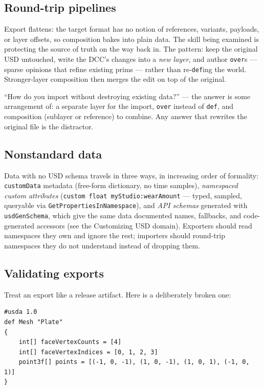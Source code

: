 \subsection{Round-trip pipelines}\label{sec:de-rt}
Export flattens: the target format has no notion of
references, variants, payloads, or layer offsets, so composition bakes into
plain data. The skill being examined is protecting the source of truth on the
way back in. The pattern: keep the original USD untouched, write the DCC's
changes into a \emph{new layer}, and author \texttt{over}s ---
sparse opinions that refine existing prims --- rather than re-\texttt{def}ing
the world. Stronger-layer composition then merges the edit on top of the
original.

\begin{ExamTip}
``How do you import without destroying existing data?'' --- the answer is
some arrangement of: a separate layer for the import, \texttt{over} instead
of \texttt{def}, and composition (sublayer or reference) to combine. Any
answer that rewrites the original file is the distractor.
\end{ExamTip}

\subsection{Nonstandard data}\label{sec:de-nonstd}
Data with no USD schema travels in
three ways, in increasing order of formality: \texttt{customData} metadata
(free-form dictionary, no time samples), \emph{namespaced custom attributes}
(\texttt{custom float myStudio:wearAmount} --- typed, sampled, queryable via
\texttt{GetPropertiesInNamespace}), and \emph{API schemas} generated with
\texttt{usdGenSchema}, which give the same data documented names, fallbacks,
and code-generated accessors (see the Customizing USD domain). Exporters
should read namespaces they own and ignore the rest; importers should
round-trip namespaces they do not understand instead of dropping them.

\subsection{Validating exports}\label{sec:de-val}
Treat an export like a release artifact. Here is a deliberately broken one:

\begin{lstlisting}
#usda 1.0
def Mesh "Plate"
{
    int[] faceVertexCounts = [4]
    int[] faceVertexIndices = [0, 1, 2, 3]
    point3f[] points = [(-1, 0, -1), (1, 0, -1), (1, 0, 1), (-1, 0, 1)]
}
\end{lstlisting}

